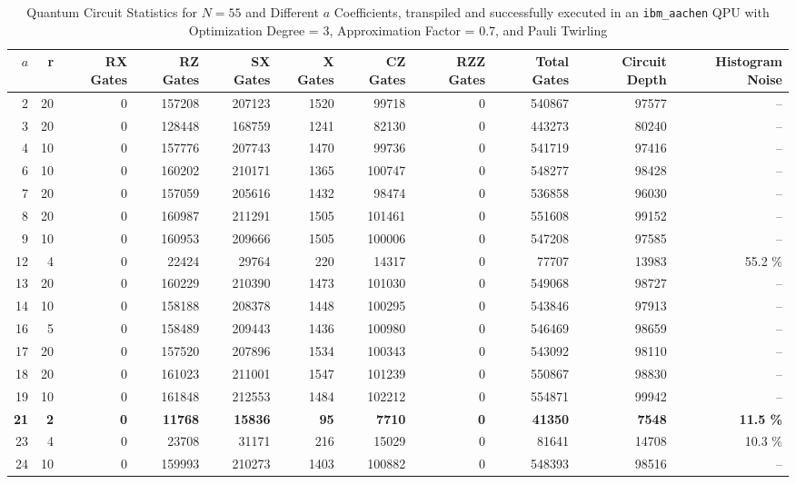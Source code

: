 \documentclass[conference,twoside]{IEEEtran}
\begin{document}
\begin{table}[h]
\centering
\caption{Quantum Circuit Statistics for $N=55$ and Different $a$ Coefficients, transpiled and successfully executed in an \texttt{ibm\_aachen} QPU with Optimization Degree = 3, Approximation Factor = 0.7, and Pauli Twirling}
\label{tab:QC_statistics_N=55_all_a}
\begin{tabular}{rrrrrrrrrrr}
\toprule
$a$ & r & RX Gates & RZ Gates & SX Gates & X Gates & CZ Gates & RZZ Gates & Total Gates & Circuit Depth & Histogram Noise\\
\midrule
2 & 20 & 0  & 157208 & 207123 & 1520  & 99718  & 0  & 540867 & 97577 & -- \\
3 & 20 & 0  & 128448 & 168759 & 1241  & 82130  & 0  & 443273 & 80240 & --   \\
4 & 10 & 0  & 157776 & 207743 & 1470  & 99736  & 0  & 541719 & 97416 & --   \\
6 & 10 & 0  & 160202 & 210171 & 1365  & 100747 & 0  & 548277 & 98428 & --   \\
7 & 20 & 0  & 157059 & 205616 & 1432  & 98474  & 0  & 536858 & 96030 & --   \\
8 & 20 & 0  & 160987 & 211291 & 1505  & 101461 & 0  & 551608 & 99152 & --   \\
9 & 10 & 0  & 160953 & 209666 & 1505  & 100006 & 0  & 547208 & 97585 & --   \\
12 & 4 & 0  & 22424  & 29764  & 220   & 14317  & 0  & 77707  & 13983 & 55.2 \%   \\
13 & 20 & 0  & 160229 & 210390 & 1473  & 101030 & 0  & 549068 & 98727 & --   \\
14 & 10 & 0  & 158188 & 208378 & 1448  & 100295 & 0  & 543846 & 97913 & --   \\
16 & 5 & 0  & 158489 & 209443 & 1436  & 100980 & 0  & 546469 & 98659 & --   \\
17 & 20 & 0  & 157520 & 207896 & 1534  & 100343 & 0  & 543092 & 98110 & --   \\
18 & 20 & 0  & 161023 & 211001 & 1547  & 101239 & 0  & 550867 & 98830 & --   \\
19 & 10 & 0  & 161848 & 212553 & 1484  & 102212 & 0  & 554871 & 99942 & --   \\
\textbf{21} & \textbf{2} & \textbf{0} & \textbf{11768} & \textbf{15836}  & \textbf{95} & \textbf{7710}   & \textbf{0}  & \textbf{41350}  & \textbf{7548}  & \textbf{11.5 \%}   \\
23 & 4 & 0  & 23708  & 31171  & 216   & 15029  & 0  & 81641  & 14708 & 10.3 \%   \\
24 & 10 & 0  & 159993 & 210273 & 1403  & 100882 & 0  & 548393 & 98516 & --   \\

\end{tabular}
\end{table}
\end{document}
